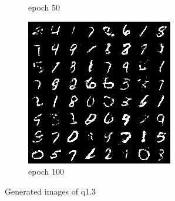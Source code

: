 \documentclass[a4paper]{article}
\theoremstyle{definition}
\newenvironment{soln}{
	\leavevmode\color{blue}\ignorespaces
}{}
\begin{document}
\begin{enumerate} [label=(\alph*)]
\begin{soln}
\begin{figure}[H]
\begin{subfigure}[b]{0.3\textwidth}
					\caption{epoch 50}
				\end{subfigure}
				\hfill
				\begin{subfigure}[b]{0.3\textwidth}
					\centering
					\includegraphics[width=\textwidth]{outputs/q3/gen_img100.png}
					\caption{epoch 100}
				\end{subfigure}
				\caption{Generated images of q1.3}
				\label{fig:three graphs}
			\end{figure}
		\end{soln}
		
		
	\end{enumerate}
\end{document}
